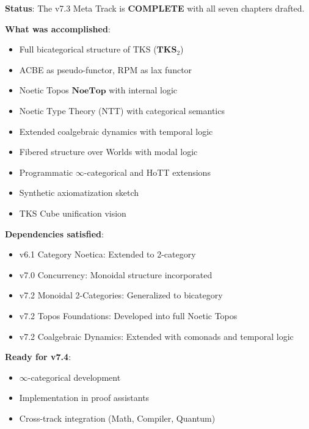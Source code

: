 \begin{tcolorbox}[colback=yellow!5!white,colframe=yellow!75!black,title=\textbf{Handoff: v7.3 Meta Track Complete},breakable]
\textbf{Status}: The v7.3 Meta Track is \textbf{COMPLETE} with all seven chapters drafted.

\textbf{What was accomplished}:
\begin{itemize}
  \item Full bicategorical structure of TKS ($\mathbf{TKS}_2$)
  \item ACBE as pseudo-functor, RPM as lax functor
  \item Noetic Topos $\mathbf{NoeTop}$ with internal logic
  \item Noetic Type Theory (NTT) with categorical semantics
  \item Extended coalgebraic dynamics with temporal logic
  \item Fibered structure over Worlds with modal logic
  \item Programmatic $\infty$-categorical and HoTT extensions
  \item Synthetic axiomatization sketch
  \item TKS Cube unification vision
\end{itemize}

\textbf{Dependencies satisfied}:
\begin{itemize}
  \item v6.1 Category Noetica: Extended to 2-category
  \item v7.0 Concurrency: Monoidal structure incorporated
  \item v7.2 Monoidal 2-Categories: Generalized to bicategory
  \item v7.2 Topos Foundations: Developed into full Noetic Topos
  \item v7.2 Coalgebraic Dynamics: Extended with comonads and temporal logic
\end{itemize}

\textbf{Ready for v7.4}:
\begin{itemize}
  \item $\infty$-categorical development
  \item Implementation in proof assistants
  \item Cross-track integration (Math, Compiler, Quantum)
\end{itemize}
\end{tcolorbox}

